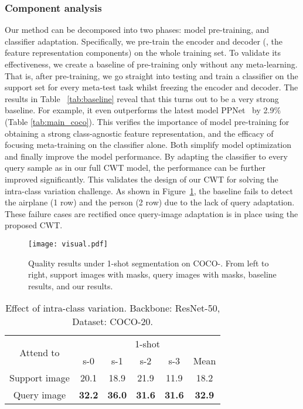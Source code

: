 \documentclass[10pt,twocolumn,letterpaper]{article}
\begin{document}
\subsubsection{Component analysis}
Our method can be decomposed into two phases:
model pre-training, and classifier adaptation.
Specifically, we pre-train the encoder and decoder (\ie, the feature representation components) on the whole training set.
To validate its effectiveness, 
we create a baseline of pre-training only without any meta-learning. That is, after pre-training, we go straight into testing and  
train a classifier on the support set for every meta-test task whilst freezing
the encoder and decoder.
The results in Table ~\ref{tab:baseline} reveal that
this turns out to be a very strong baseline.
For example, it even outperforms the latest model PPNet~\cite{liu2020part} by {2.9\%} (Table \ref{tab:main_coco}). 
This verifies the importance of model pre-training
for obtaining a strong class-agnostic feature representation,
and the efficacy of focusing meta-training on the classifier alone.
Both simplify model optimization and finally improve the model performance.
By adapting the classifier to every query sample as in our full CWT model,
the performance can be further improved significantly. 
This validates the design of our CWT
for solving the intra-class variation challenge.
As shown in Figure~\ref{fig:visual},
the baseline fails to detect the airplane (1 row) 
and the person (2 row) due to the lack of query adaptation. These failure cases are rectified once query-image adaptation is in place using the proposed CWT. 









\begin{figure}
    \centering
    \texttt{[image: visual.pdf]}
    \caption{Quality results under 1-shot segmentation on COCO-. From left to right, 
    support images with masks, 
    query images with masks, 
    baseline results, and our results.}
    \label{fig:visual}
\end{figure}




\begin{table}[]
    \centering
    \begin{tabular}{c|ccccc}
    \hline
         \multirow{2}{*}{Attend to} & \multicolumn{5}{c}{1-shot}  \\
         \cline{2-6}
          & s-0 & s-1 & s-2 & s-3 & Mean \\
         \hline
         Support image & 20.1 & 18.9 & 21.9 & 11.9 & 18.2  \\
         Query image & \textbf{32.2} & \textbf{36.0} & \textbf{31.6} & \textbf{31.6} & \textbf{32.9} \\
         \hline
    \end{tabular}
    \vspace{2pt}
    \caption{Effect of intra-class variation.
    Backbone: ResNet-50,
    Dataset: COCO-20.}
    \vspace{-0.4cm}
\label{tab:support}
\end{table}
\end{document}
